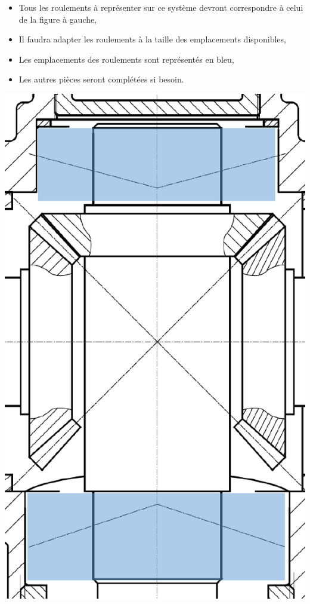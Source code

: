 \begin{minipage}{0.6\linewidth}
\begin{minipage}{0.25\linewidth}
\begin{center}
\end{center}
\end{minipage}\hfill
\begin{minipage}{0.7\linewidth}
\begin{itemize}
 \item Tous les roulements à représenter sur ce système devront correspondre à celui de la figure à gauche,
 \item Il faudra adapter les roulements à la taille des emplacements disponibles,
 \item Les emplacements des roulements sont représentés en bleu,
 \item Les autres pièces seront complétées si besoin.
\end{itemize}
\end{minipage}\end{minipage}\hfill
\begin{minipage}{0.35\linewidth}
\begin{center}
 \includegraphics[width=0.8\linewidth]{img/fig2.pdf}
\end{center}
\end{minipage}

